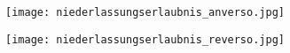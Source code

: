 \documentclass[a4paper]{article}
\begin{document}
    
    

    \begin{minipage}{0.5\textwidth}
        \texttt{[image: niederlassungserlaubnis\_anverso.jpg]}
    \end{minipage}%
    \begin{minipage}{0.5\textwidth}
        \texttt{[image: niederlassungserlaubnis\_reverso.jpg]}
    \end{minipage}%

    
    
\end{document}
